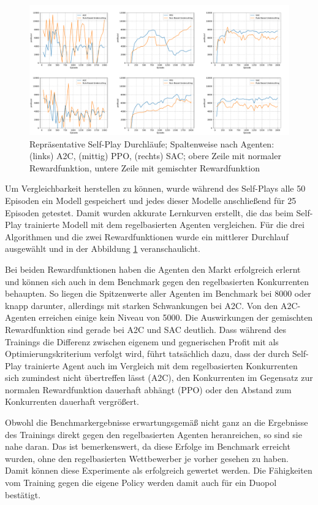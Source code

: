 \begin{figure}[htb]
	\centering
	\includegraphics[width=\textwidth]{main/self_play_detailed.pdf}
	\caption{Repräsentative Self-Play Durchläufe; Spaltenweise nach Agenten: (links) A2C, (mittig) PPO, (rechts) SAC; obere Zeile mit normaler Rewardfunktion, untere Zeile mit gemischter Rewardfunktion}
	\label{graphic:SelfPlayDetails}
\end{figure}
Um Vergleichbarkeit herstellen zu können, wurde während des Self-Plays alle 50 Episoden ein Modell gespeichert und jedes dieser Modelle anschließend für 25 Episoden getestet.
Damit wurden akkurate Lernkurven erstellt, die das beim Self-Play trainierte Modell mit dem regelbasierten Agenten vergleichen.
Für die drei Algorithmen und die zwei Rewardfunktionen wurde ein mittlerer Durchlauf ausgewählt und in der Abbildung \ref{graphic:SelfPlayDetails} veranschaulicht.

Bei beiden Rewardfunktionen haben die Agenten den Markt erfolgreich erlernt und können sich auch in dem Benchmark gegen den regelbasierten Konkurrenten behaupten.
So liegen die Spitzenwerte aller Agenten im Benchmark bei 8000 oder knapp darunter, allerdings mit starken Schwankungen bei A2C.
Von den A2C-Agenten erreichen einige kein Niveau von 5000.
Die Auswirkungen der gemischten Rewardfunktion sind gerade bei A2C und SAC deutlich.
Dass während des Trainings die Differenz zwischen eigenem und gegnerischen Profit mit als Optimierungskriterium verfolgt wird, führt tatsächlich dazu, dass der durch Self-Play trainierte Agent auch im Vergleich mit dem regelbasierten Konkurrenten sich zumindest nicht übertreffen lässt (A2C), den Konkurrenten im Gegensatz zur normalen Rewardfunktion dauerhaft abhängt (PPO) oder den Abstand zum Konkurrenten dauerhaft vergrößert.

Obwohl die Benchmarkergebnisse erwartungsgemäß nicht ganz an die Ergebnisse des Trainings direkt gegen den regelbasierten Agenten heranreichen, so sind sie nahe daran.
Das ist bemerkenswert, da diese Erfolge im Benchmark erreicht wurden, ohne den regelbasierten Wettbewerber je vorher gesehen zu haben.
Damit können diese Experimente als erfolgreich gewertet werden.
Die Fähigkeiten vom Training gegen die eigene Policy werden damit auch für ein Duopol bestätigt.

